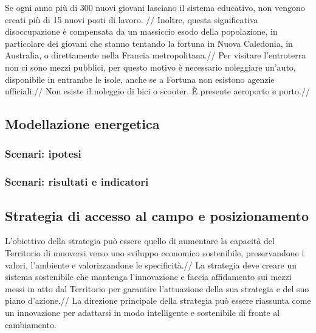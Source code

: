 \documentclass[fleqn,10pt]{SelfArx} %
\begin{document}
Se ogni anno più di 300 nuovi giovani lasciano il sistema educativo, non vengono creati più di 15 nuovi posti di lavoro. //
Inoltre, questa significativa disoccupazione è compensata da un massiccio esodo della popolazione, in particolare dei giovani che stanno tentando la fortuna in Nuova Caledonia, in Australia, o direttamente nella Francia metropolitana.// 
Per visitare l'entroterra non ci sono mezzi pubblici, per questo motivo è necessario noleggiare un'auto, disponibile in entrambe le isole, anche se a Fortuna non esistono agenzie ufficiali.// 
Non esiste il noleggio di bici o scooter. È presente aeroporto e porto.//

\subsection{Modellazione energetica}
\subsubsection{Scenari: ipotesi}
\subsubsection{Scenari: risultati e indicatori}
\subsection{Strategia di accesso al campo e posizionamento}
L'obiettivo della strategia può essere quello di aumentare la capacità del Territorio di muoversi verso uno sviluppo economico sostenibile, preservandone i valori, l'ambiente e valorizzandone le specificità.//
La strategia deve creare un sistema sostenibile che mantenga l'innovazione e faccia affidamento sui mezzi messi in atto dal Territorio per garantire l'attuazione della sua strategia e del suo piano d'azione.//
La direzione principale della strategia può essere riassunta come un innovazione per adattarsi in modo intelligente e sostenibile di fronte al cambiamento.
\end{document}
